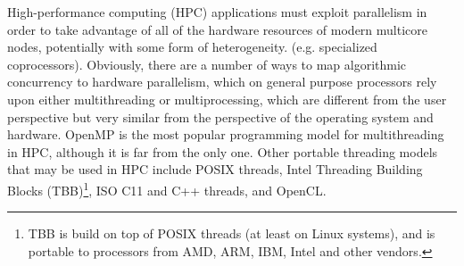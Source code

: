 High-performance computing (HPC) applications must exploit parallelism
in order to take advantage of all of the hardware resources of
modern multicore nodes, potentially with some form of heterogeneity.
(e.g. specialized coprocessors).
Obviously, there are a number of ways to map algorithmic concurrency
to hardware parallelism, which on general purpose processors rely
upon either multithreading or multiprocessing, which are different
from the user perspective but very similar from the perspective of
the operating system and hardware.
OpenMP is the most popular programming model for multithreading in HPC,
although it is far from the only one.
Other portable threading models that may be used in HPC include
POSIX threads,
Intel\regtm{} Threading Building Blocks (TBB)\footnote{TBB is build on top
of POSIX\othertm{} threads (at least on Linux\othertm{} systems), and is portable to
processors from AMD\othertm, ARM\othertm, IBM\othertm, Intel and other vendors.},
ISO\othertm{} C11 and C++ threads, and
OpenCL\othertm.

